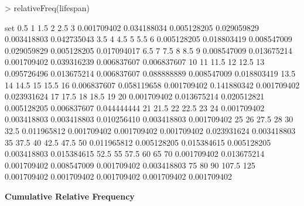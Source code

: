 \documentclass[a4paper]{article}
\begin{document}
\begin{Schunk}
\begin{Sinput}
> relativeFreq(lifespan)
\end{Sinput}
\begin{Soutput}
set
        0.5           1         1.5           2         2.5           3 
0.001709402 0.034188034 0.005128205 0.029059829 0.003418803 0.042735043 
        3.5           4         4.5           5         5.5           6 
0.005128205 0.018803419 0.008547009 0.029059829 0.005128205 0.017094017 
        6.5           7         7.5           8         8.5           9 
0.008547009 0.013675214 0.001709402 0.039316239 0.006837607 0.006837607 
         10          11        11.5          12        12.5          13 
0.095726496 0.013675214 0.006837607 0.088888889 0.008547009 0.018803419 
       13.5          14        14.5          15        15.5          16 
0.006837607 0.058119658 0.001709402 0.141880342 0.001709402 0.023931624 
         17        17.5          18        18.5          19          20 
0.001709402 0.013675214 0.020512821 0.005128205 0.006837607 0.044444444 
         21        21.5          22        22.5          23          24 
0.001709402 0.003418803 0.003418803 0.010256410 0.003418803 0.001709402 
         25          26        27.5          28          30        32.5 
0.011965812 0.001709402 0.001709402 0.001709402 0.023931624 0.003418803 
         35        37.5          40        42.5        47.5          50 
0.011965812 0.005128205 0.015384615 0.005128205 0.003418803 0.015384615 
       52.5          55        57.5          60          65          70 
0.001709402 0.013675214 0.001709402 0.008547009 0.001709402 0.003418803 
         75          80          90       107.5         125 
0.001709402 0.001709402 0.001709402 0.001709402 0.001709402 
\end{Soutput}
\end{Schunk}


\textbf{Cumulative Relative Frequency}
\end{document}
